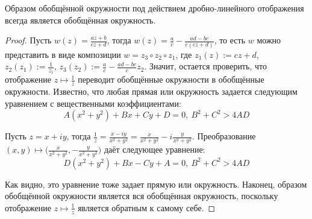 \begin{proposition}
	Образом обобщённой окружности под действием дробно-линейного отображения всегда является обобщённая окружность.
\end{proposition}

\begin{proof}
	Пусть $w(z) = \frac{az + b}{cz + d}$, тогда $w(z) = \frac ac - \frac{ad - bc}{c(cz + d)}$, то есть $w$ можно представить в виде композиции $w = z_3 \circ z_2 \circ z_1$, где $z_1(z) := cz + d$, $z_2(z_1) := \frac 1{z_1}$, $z_3(z_2) := \frac ac - \frac{ ad - bc}c z_2$. Значит, остается проверить, что отображение $z \mapsto \frac 1z$ переводит обобщённые окружности в обобщённые окружности. Известно, что любая прямая или окружность задается следующим уравнением с вещественными коэффициентами:
	\[A(x^2 + y^2) + Bx + Cy + D = 0,~B^2 + C^2 > 4AD\]
	
	Пусть $z = x + iy$, тогда $\frac 1z = \frac{x - iy}{x^2 + y^2} = \frac{x}{x^2 + y^2} - i\frac{y}{x^2 + y^2}$. Преобразование $(x, y) \mapsto \big(\frac{x}{x^2 + y^2}, -\frac{y}{x^2 + y^2}\big)$ даёт следующее уравнение:
	\[D(x^2 + y^2) + Bx - Cy + A = 0,~B^2 + C^2 > 4AD\]
	
	Как видно, это уравнение тоже задает прямую или окружность. Наконец, образом обобщённой окружности является вся обобщённая окружность, поскольку отображение $z \mapsto \frac 1z$ является обратным к самому себе.
\end{proof}